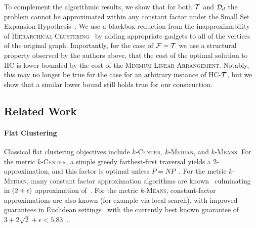 To complement the algorithmic results, we show that for both $\mathcal{T}$ and $\mathcal{D}_d$ the problem cannot be approximated within any constant factor under the Small Set Expansion Hypothesis~\cite{GraphExpansionAndTheUniqueGamesConjecture}. We use a blackbox reduction from the inapproximability of \textsc{Hierarchical Clustering}~\cite{ApproximateHierarchicalClusteringViaSparsestCutAndSpreadingMetrics} by adding appropriate gadgets to all of the vertices of the original graph. Importantly, for the case of $\mathcal{F}=\mathcal{T}$ we use a structural property observed by the authors above, that the cost of the optimal solution to \textsc{HC} is lower bounded by the cost of the \textsc{Minimum Linear Arrangement}. Notably, this may no longer be true for the case for an arbitrary instance of \textsc{HC-$\mathcal{T}$}, but we show that a similar lower bound still holds true for our construction.
\subsection{Related Work}

\paragraph{Flat Clustering}
Classical flat clustering objectives include \textsc{$k$-Center}, \textsc{$k$-Median}, and \textsc{$k$-Means}. For the metric \textsc{$k$-Center}, a simple greedy farthest-first traversal yields a $2$-approximation, and this factor is optimal unless $P=NP$~\cite{GonzalezKCenter, HochbaumShmoysKCenter}. For the metric \textsc{$k$-Median}, many constant factor approximation algorithms are known~\cite{AConstant-FactorApproximationAlgorithmForTheKMedianProblem, ApproximationAlgorithmsForMetricFacilityLocationAndKMedianProblemsUsingThePrimal-DualSchemaAndLagrangianRelaxation, ANewGreedyApproachForFacilityLocationProblems, AryaLocalSearchKMedian, Approximating_k-Median_via_Pseudo-Approximation, AnImprovedApproximationForKMedianAndPositiveCorrelationInBudgetedOptimization,BreachingThe2LMPApproximationBarrierForFacilityLocationWithApplicationsToKMedian} culminating in $\mathopen{}\left( 2+\epsilon \right)$ approximation of~\cite{A2-ApproximationAlgorithmForMetricKMedian}. For the metric \textsc{$k$-Means}, constant-factor approximations are also known (for example via local search), with improved guarantees in Euclidean settings~\cite{KanungoKMeansLocalSearch, AhmadianKMeansImprovedApprox} with the currently best known guarantee of $3+2\sqrt{2}+\epsilon< 5.83$~\cite{AnImprovedGreedyApproximationForMetricKMeans}.

